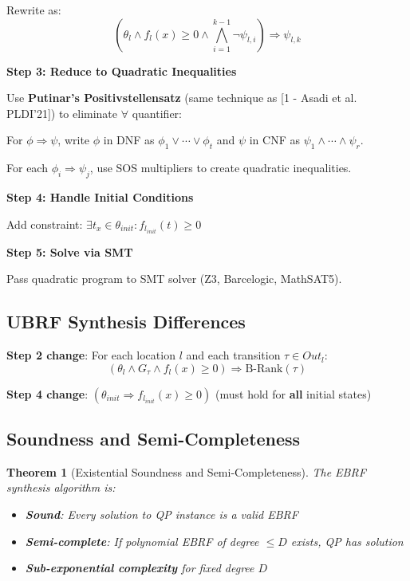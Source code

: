 \documentclass{article}
\newtheorem{theorem}{Theorem}
\begin{document}
\begin{enumerate}
Rewrite as:
\begin{equation}
\left(\theta_l \land f_l(x) \geq 0 \land \bigwedge_{i=1}^{k-1} \neg\psi_{l,i}\right) \Rightarrow \psi_{l,k}
\end{equation}

\textbf{Step 3: Reduce to Quadratic Inequalities}

Use \textbf{Putinar's Positivstellensatz} (same technique as [1 - Asadi et al. PLDI'21]) to eliminate $\forall$ quantifier:

For $\phi \Rightarrow \psi$, write $\phi$ in DNF as $\phi_1 \lor \cdots \lor \phi_t$ and $\psi$ in CNF as $\psi_1 \land \cdots \land \psi_r$.

For each $\phi_i \Rightarrow \psi_j$, use SOS multipliers to create quadratic inequalities.

\textbf{Step 4: Handle Initial Conditions}

Add constraint: $\exists t_x \in \theta_{init}: f_{l_{init}}(t) \geq 0$

\textbf{Step 5: Solve via SMT}

Pass quadratic program to SMT solver (Z3, Barcelogic, MathSAT5).

\subsection{UBRF Synthesis Differences}

\textbf{Step 2 change}: For each location $l$ and each transition $\tau \in Out_l$:
\begin{equation}
(\theta_l \land G_\tau \land f_l(x) \geq 0) \Rightarrow \text{B-Rank}(\tau)
\end{equation}

\textbf{Step 4 change}: $(\theta_{init} \Rightarrow f_{l_{init}}(x) \geq 0)$ (must hold for \textbf{all} initial states)

\subsection{Soundness and Semi-Completeness}

\begin{theorem}[Existential Soundness and Semi-Completeness]
The EBRF synthesis algorithm is:
\begin{itemize}
    \item \textbf{Sound}: Every solution to QP instance is a valid EBRF
    \item \textbf{Semi-complete}: If polynomial EBRF of degree $\leq D$ exists, QP has solution
    \item \textbf{Sub-exponential complexity} for fixed degree $D$
\end{itemize}
\end{theorem}


\end{enumerate}
\end{document}
